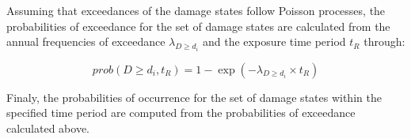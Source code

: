 Assuming that exceedances of the damage states follow Poisson processes, the probabilities of exceedance for the set of damage states are calculated from the annual frequencies of exceedance $\lambda_{D \geq d_i}$ and the exposure time period $t_R$ through:

\begin{equation}
	prob(D \geq d_i, t_R) = 1 - \exp (-\lambda_{D \geq d_i} \times t_R)
\end{equation}

Finaly, the probabilities of occurrence for the set of damage states within the specified time period are computed from the probabilities of exceedance calculated above.